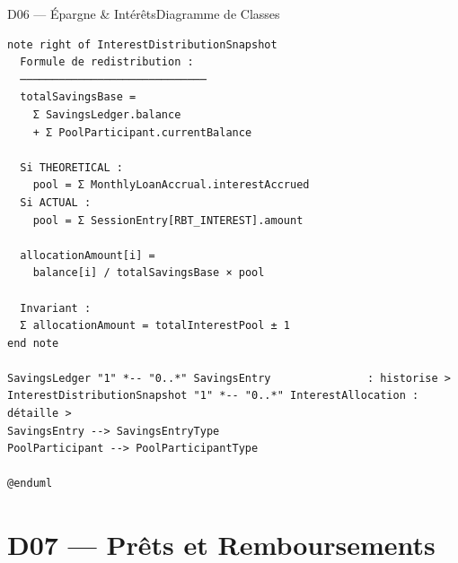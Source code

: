 \documentclass[12pt, a4paper]{report}
\begin{document}
\begin{diagramBox}{D06 — Épargne \& Intérêts}{Diagramme de Classes}
\begin{lstlisting}
note right of InterestDistributionSnapshot
  Formule de redistribution :
  ─────────────────────────────
  totalSavingsBase =
    Σ SavingsLedger.balance
    + Σ PoolParticipant.currentBalance

  Si THEORETICAL :
    pool = Σ MonthlyLoanAccrual.interestAccrued
  Si ACTUAL :
    pool = Σ SessionEntry[RBT_INTEREST].amount

  allocationAmount[i] =
    balance[i] / totalSavingsBase × pool

  Invariant :
  Σ allocationAmount = totalInterestPool ± 1
end note

SavingsLedger "1" *-- "0..*" SavingsEntry               : historise >
InterestDistributionSnapshot "1" *-- "0..*" InterestAllocation : détaille >
SavingsEntry --> SavingsEntryType
PoolParticipant --> PoolParticipantType

@enduml
\end{lstlisting}
\end{diagramBox}

\section{D07 — Prêts et Remboursements}
\end{document}
